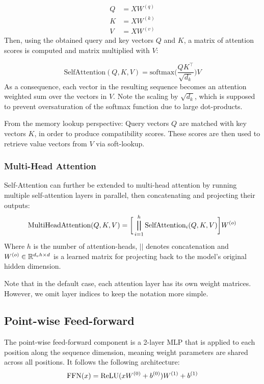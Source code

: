 \begin{align}
    Q & = X W^{(q)} \\
    K & = X W^{(k)} \\
    V & = X W^{(v)}
\end{align}
Then, using the obtained query and key vectors $Q$ and $K$, a matrix of attention scores is computed and matrix multiplied with $V$:

\begin{equation}
    \text{SelfAttention}(Q, K, V) = \text{softmax}\bigg(\frac{Q K^\top}{\sqrt{d_k}}\bigg) V
\end{equation}
As a consequence, each vector in the resulting sequence becomes an attention weighted sum over the vectors in $V$. Note the scaling by $\sqrt{d_k}$, which is supposed to prevent oversaturation of the softmax function due to large dot-products.

From the memory lookup perspective: Query vectors $Q$ are matched with key vectors $K$, in order to produce compatibility scores. These scores are then used to retrieve value vectors from $V$ via soft-lookup.

\subsubsection{Multi-Head Attention}
Self-Attention can further be extended to multi-head attention by running multiple self-attention layers in parallel, then concatenating and projecting their outputs:
\begin{equation}
    \text{MultiHeadAttention}(Q, K, V) = \bigg[ \bigparallel_{i=1}^h \text{SelfAttention}_i(Q,K,V) \bigg] W^{(o)}
\end{equation}
Where $h$ is the number of attention-heads, $||$ denotes concatenation and $W^{(o)} \in \mathbb{R}^{d_v h \times d}$ is a learned matrix for projecting back to the model's original hidden dimension.

Note that in the default case, each attention layer has its own weight matrices. However,  we omit layer indices to keep the notation more simple.

\subsection{Point-wise Feed-forward}
The point-wise feed-forward component is a 2-layer MLP that is applied to each position along the sequence dimension, meaning weight parameters are shared across all positions. It follows the following architecture:
\begin{equation}
    \text{FFN}(x) = \text{ReLU}(x W^{(0)} + b^{(0)}) W^{(1)} + b^{(1)}
\end{equation}

